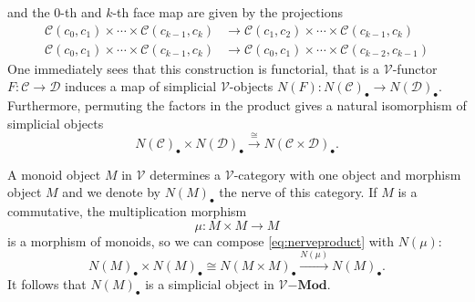 and the $0$-th and $k$-th face map are given by the projections
\begin{align*}
\mathcal{C}(c_0,c_1)\times \cdots \times \mathcal{C}(c_{k-1}, c_k)
&\to \mathcal{C}(c_1,c_2)\times \cdots \times \mathcal{C}(c_{k-1}, c_k)\\
\mathcal{C}(c_0,c_1)\times \cdots \times \mathcal{C}(c_{k-1}, c_k)
&\to \mathcal{C}(c_0,c_1)\times \cdots \times \mathcal{C}(c_{k-2}, c_{k-1})
\end{align*}
One immediately sees that this construction is functorial, that is a $\mathcal{V}$-functor 
$F: \mathcal{C}\to \mathcal{D}$ induces a map of simplicial $\mathcal{V}$-objects 
$N(F) : N(\mathcal{C})_\bullet \to N(\mathcal{D})_\bullet$. Furthermore,
permuting the factors in the product gives a natural isomorphism
of simplicial objects
\begin{equation}\label{eq:nerveproduct}
N(\mathcal{C})_\bullet \times N(\mathcal{D})_\bullet
\xrightarrow{\cong} N(\mathcal{C} \times \mathcal{D})_\bullet.
\end{equation}
%
%

A monoid object $M$ in $\mathcal{V}$ determines a $\mathcal{V}$-category
with one object and morphism object $M$ and we denote by $N(M)_\bullet$
the nerve of this category.
If $M$ is 
a commutative, the multiplication morphism
\[
\mu:M\times M\rightarrow M
\]
is a morphism of monoids, so we can compose \eqref{eq:nerveproduct} with
$N(\mu)$:
\begin{equation}\label{eq:nervemultiplication}
N(M)_\bullet\times N(M)_\bullet\cong N(M\times M)_\bullet\xrightarrow{N(\mu)} N(M)_\bullet.
\end{equation}
It follows that $N(M)_\bullet$ is a simplicial object in $\mathcal{V}\mathbf{-Mod}$. 

